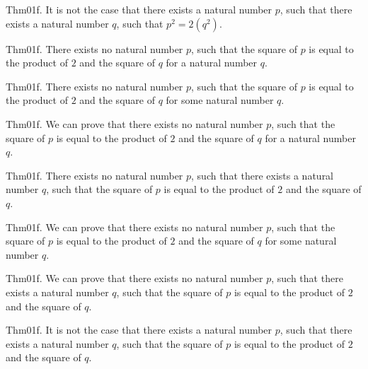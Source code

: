 \documentclass{article}
\begin{document}
Thm01f. It is not the case that there exists a natural number $p$, such that there exists a natural number $q$, such that $p ^{ 2}= 2 (q ^{ 2})$.

Thm01f. There exists no natural number $p$, such that the square of $p$ is equal to the product of $2$ and the square of $q$ for a natural number $q$.

Thm01f. There exists no natural number $p$, such that the square of $p$ is equal to the product of $2$ and the square of $q$ for some natural number $q$.

Thm01f. We can prove that there exists no natural number $p$, such that the square of $p$ is equal to the product of $2$ and the square of $q$ for a natural number $q$.

Thm01f. There exists no natural number $p$, such that there exists a natural number $q$, such that the square of $p$ is equal to the product of $2$ and the square of $q$.

Thm01f. We can prove that there exists no natural number $p$, such that the square of $p$ is equal to the product of $2$ and the square of $q$ for some natural number $q$.

Thm01f. We can prove that there exists no natural number $p$, such that there exists a natural number $q$, such that the square of $p$ is equal to the product of $2$ and the square of $q$.

Thm01f. It is not the case that there exists a natural number $p$, such that there exists a natural number $q$, such that the square of $p$ is equal to the product of $2$ and the square of $q$.
\end{document}
